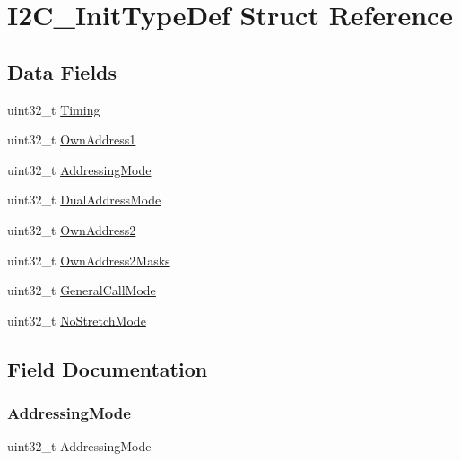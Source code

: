 \hypertarget{struct_i2_c___init_type_def}{}\section{I2\+C\+\_\+\+Init\+Type\+Def Struct Reference}
\label{struct_i2_c___init_type_def}
\subsection*{Data Fields}
\begin{DoxyCompactItemize}
\item 
uint32\+\_\+t \hyperlink{struct_i2_c___init_type_def_acd4afe05c37d7924e50f6795641dbd70}{Timing}
\item 
uint32\+\_\+t \hyperlink{struct_i2_c___init_type_def_a8abec5c168e27bf11b2808c1450bdeda}{Own\+Address1}
\item 
uint32\+\_\+t \hyperlink{struct_i2_c___init_type_def_aa7afcb44ef1f351763d7dc69ba0f4f8c}{Addressing\+Mode}
\item 
uint32\+\_\+t \hyperlink{struct_i2_c___init_type_def_aabb4e156aa4af60dfaf591419e9b1a07}{Dual\+Address\+Mode}
\item 
uint32\+\_\+t \hyperlink{struct_i2_c___init_type_def_a6300c7a7e1b7d5444226a1bd55744f53}{Own\+Address2}
\item 
uint32\+\_\+t \hyperlink{struct_i2_c___init_type_def_a4fb48639ef769c55e617e6b97e63a531}{Own\+Address2\+Masks}
\item 
uint32\+\_\+t \hyperlink{struct_i2_c___init_type_def_afc70f58c0935194064d720779fbf22b5}{General\+Call\+Mode}
\item 
uint32\+\_\+t \hyperlink{struct_i2_c___init_type_def_a47971fd08a9784eddaa3d83fb998030c}{No\+Stretch\+Mode}
\end{DoxyCompactItemize}


\subsection{Field Documentation}
\mbox{\label{struct_i2_c___init_type_def_aa7afcb44ef1f351763d7dc69ba0f4f8c}} 
\subsubsection{\texorpdfstring{Addressing\+Mode}{AddressingMode}}
{\footnotesize\ttfamily uint32\+\_\+t Addressing\+Mode}

